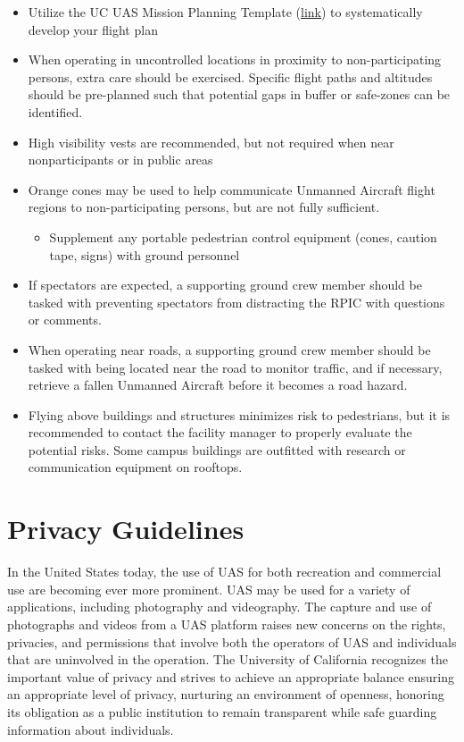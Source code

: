 \documentclass[
]{book}
\providecommand{\tightlist}{%
  \setlength{\itemsep}{0pt}\setlength{\parskip}{0pt}}
\begin{document}
\begin{itemize}
\tightlist
\item
  Utilize the UC UAS Mission Planning Template (\href{http://ucdrones.github.io/library/mission_planning_template.docx}{link}) to systematically develop your flight plan
\item
  When operating in uncontrolled locations in proximity to non-participating persons, extra care should be exercised. Specific flight paths and altitudes should be pre-planned such that potential gaps in buffer or safe-zones can be identified.
\item
  High visibility vests are recommended, but not required when near nonparticipants or in public areas
\item
  Orange cones may be used to help communicate Unmanned Aircraft flight regions to non-participating persons, but are not fully sufficient.

  \begin{itemize}
  \tightlist
  \item
    Supplement any portable pedestrian control equipment (cones, caution tape, signs) with ground personnel
  \end{itemize}
\item
  If spectators are expected, a supporting ground crew member should be tasked with preventing spectators from distracting the RPIC with questions or comments.
\item
  When operating near roads, a supporting ground crew member should be tasked with being located near the road to monitor traffic, and if necessary, retrieve a fallen Unmanned Aircraft before it becomes a road hazard.
\item
  Flying above buildings and structures minimizes risk to pedestrians, but it is recommended to contact the facility manager to properly evaluate the potential risks. Some campus buildings are outfitted with research or communication equipment on rooftops.
\end{itemize}

\hypertarget{privacy-guidelines}{%
\chapter{Privacy Guidelines}\label{privacy-guidelines}}

In the United States today, the use of UAS for both recreation and commercial use are becoming ever more prominent. UAS may be used for a variety of applications, including photography and videography. The capture and use of photographs and videos from a UAS platform raises new concerns on the rights, privacies, and permissions that involve both the operators of UAS and individuals that are uninvolved in the operation. The University of California recognizes the important value of privacy and strives to achieve an appropriate balance ensuring an appropriate level of privacy, nurturing an environment of openness, honoring its obligation as a public institution to remain transparent while safe guarding information about individuals.
\end{document}
